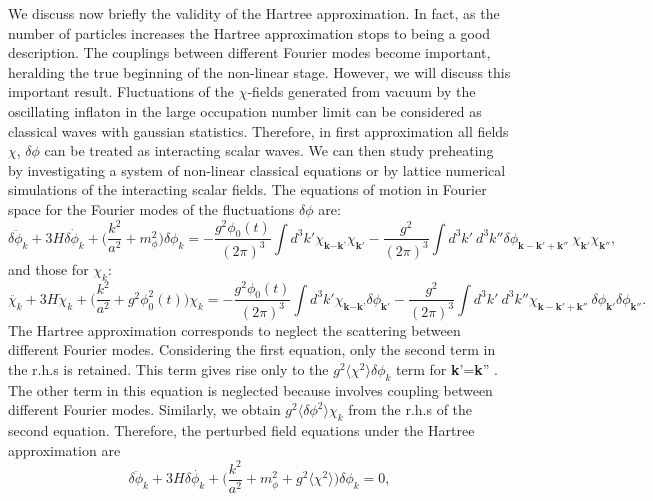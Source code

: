 \documentclass[11pt,a4paper,twoside]{book}
\begin{document}
 We discuss now briefly the validity of the Hartree approximation. In fact, as the number of particles increases the Hartree approximation stops to  being a good description. The couplings between different Fourier modes become important, heralding the true beginning of the non-linear stage.  
However, we will discuss this important result. Fluctuations of the $\chi$-fields generated from vacuum by the oscillating inflaton in the large occupation number limit can be considered as classical waves with gaussian statistics. Therefore, in first approximation all fields $\chi$, $\delta \phi$ can be treated as interacting scalar waves. We can then study preheating by investigating  a system of non-linear classical equations or by lattice numerical simulations of the interacting scalar fields. The equations of motion in Fourier space for the Fourier modes of the fluctuations $\delta \phi$ are:
\begin{equation}
\label{Chap4:Backreaction_EquationDeltaPhi}
\ddot{\delta \phi_{k}} + 3H\delta \dot{\phi}_{k} + \Bigg(\frac{k^{2}}{a^{2}} + m^{2}_{\phi}\Bigg)\delta \phi_{k}
=-\frac{g^{2}\phi_{0}(t)}{(2\pi)^{3}} \int d^{3}k' \chi_{\textbf{k} - \textbf{k'}}\chi_{\textbf{k}'} - \frac{g^{2}}{(2\pi)^{3}}\int d^{3}k'\ d^{3} k'' \delta\phi_{\textbf{k}-\textbf{k}' + \textbf{k}''}\ \chi_{\textbf{k}'}\chi_{\textbf{k}''},
\end{equation}
and those for $ \chi_{k} $:
\begin{equation}
\label{Chap4:Backreaction_EquationChi}
\ddot{\chi_{k}} + 3H\dot{\chi}_{k} + \Bigg(\frac{k^{2}}{a^{2}} + g^{2}\phi_{0}^{2}(t)\Bigg)\chi_{k}
=-\frac{g^{2}\phi_{0}(t)}{(2\pi)^{3}} \int d^{3}k' \chi_{\textbf{k} - \textbf{k'}}\delta\phi_{\textbf{k}'} - \frac{g^{2}}{(2\pi)^{3}}\int d^{3}k'\ d^{3} k''\chi_{\textbf{k}-\textbf{k}' + \textbf{k}''}\ \delta\phi_{\textbf{k}'}\delta\phi_{\textbf{k}''}.
\end{equation}
 The Hartree approximation corresponds to neglect the scattering between different Fourier modes. Considering the first equation, only the second term in the r.h.s is retained. This term gives rise only to the  $ g^{2}\langle \chi^{2}\rangle  \delta\phi_{k} $ term for \textbf{k}'=\textbf{k}'' . The other term in this equation is neglected because involves coupling between different Fourier modes. Similarly, we obtain $ g^{2}\langle \delta \phi^{2}\rangle \chi_{k} $ from the r.h.s of the second equation. Therefore, the perturbed field equations under the Hartree approximation
 are
 \begin{equation}
\label{Chap4:Backreaction_deltaPhiHartree}
\ddot{\delta \phi_{k}} + 3H\delta \dot{\phi_{k}} + \Bigg(\frac{k^{2}}{a^{2}} + m^{2}_{\phi} + g^{2}\langle \chi^{2}\rangle  \Bigg)\delta\phi_{k} = 0,
 \end{equation}
\end{document}
